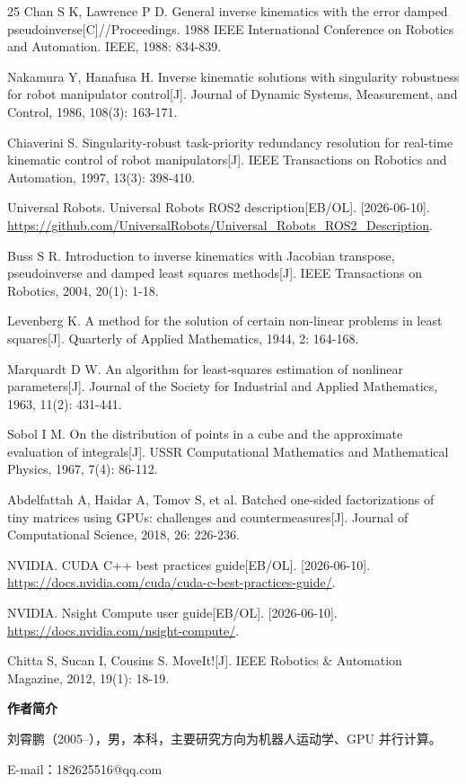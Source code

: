 \documentclass[twocolumn,a4paper,10pt]{ctexart}
\begin{document}
\begin{thebibliography}{25}
Chan S K, Lawrence P D. General inverse kinematics with the error damped pseudoinverse[C]//Proceedings. 1988 IEEE International Conference on Robotics and Automation. IEEE, 1988: 834-839.

Nakamura Y, Hanafusa H. Inverse kinematic solutions with singularity robustness for robot manipulator control[J]. Journal of Dynamic Systems, Measurement, and Control, 1986, 108(3): 163-171.

Chiaverini S. Singularity-robust task-priority redundancy resolution for real-time kinematic control of robot manipulators[J]. IEEE Transactions on Robotics and Automation, 1997, 13(3): 398-410.

Universal Robots. Universal Robots ROS2 description[EB/OL]. [2026-06-10]. \url{https://github.com/UniversalRobots/Universal_Robots_ROS2_Description}.

Buss S R. Introduction to inverse kinematics with Jacobian transpose, pseudoinverse and damped least squares methods[J]. IEEE Transactions on Robotics, 2004, 20(1): 1-18.

Levenberg K. A method for the solution of certain non-linear problems in least squares[J]. Quarterly of Applied Mathematics, 1944, 2: 164-168.

Marquardt D W. An algorithm for least-squares estimation of nonlinear parameters[J]. Journal of the Society for Industrial and Applied Mathematics, 1963, 11(2): 431-441.

Sobol I M. On the distribution of points in a cube and the approximate evaluation of integrals[J]. USSR Computational Mathematics and Mathematical Physics, 1967, 7(4): 86-112.

Abdelfattah A, Haidar A, Tomov S, et al. Batched one-sided factorizations of tiny matrices using GPUs: challenges and countermeasures[J]. Journal of Computational Science, 2018, 26: 226-236.

NVIDIA. CUDA C++ best practices guide[EB/OL]. [2026-06-10]. \url{https://docs.nvidia.com/cuda/cuda-c-best-practices-guide/}.

NVIDIA. Nsight Compute user guide[EB/OL]. [2026-06-10]. \url{https://docs.nvidia.com/nsight-compute/}.

Chitta S, Sucan I, Cousins S. MoveIt![J]. IEEE Robotics \& Automation Magazine, 2012, 19(1): 18-19.
\end{thebibliography}

\vspace{4mm}
{\bfseries 作者简介}

\vspace{2mm}
{\small 刘霄鹏（2005--），男，本科，主要研究方向为机器人运动学、GPU 并行计算。}\par
{\small E-mail：182625516@qq.com}\par
\end{document}
